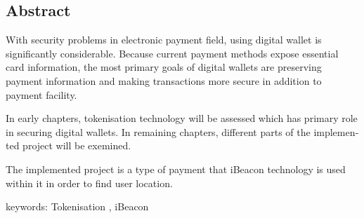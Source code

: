 \documentclass[oneside]{report}
\begin{document}
	
	
	
	
	
	
	\newpage
	\def\bibname{مراجع}
	
	
	
	\newpage
	
	\begin{latin}
		
		\section*{Abstract}
		{
			\Large
			With security problems in electronic payment field, using digital wallet 
			is significantly considerable. Because current payment methods expose essential card information, the most primary goals of digital wallets are  preserving payment information and making transactions more secure in addition to payment facility. 
			
			\noindent
			In early chapters, tokenisation technology will be assessed which has primary role in securing digital wallets. In remaining chapters, different parts of the implemented project will be exemined. 
			
			\noindent
			The implemented project is a type of payment that iBeacon technology is used within it in order to find user location. 
			
			
			
			\vspace*{1.5cm}
			
			\noindent
			keywords: Tokenisation , iBeacon 
		}
		
		
	\end{latin}	
	
	\newpage
	
\end{document}

